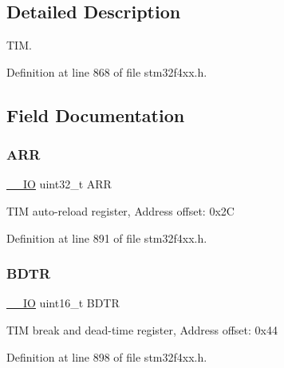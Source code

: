 \subsection{Detailed Description}
T\+IM. 

Definition at line 868 of file stm32f4xx.\+h.



\subsection{Field Documentation}
\mbox{\label{struct_t_i_m___type_def_af17f19bb4aeea3cc14fa73dfa7772cb8}} 
\subsubsection{\texorpdfstring{A\+RR}{ARR}}
{\footnotesize\ttfamily \hyperlink{group___c_m_s_i_s__core__definitions_gaec43007d9998a0a0e01faede4133d6be}{\+\_\+\+\_\+\+IO} uint32\+\_\+t A\+RR}

T\+IM auto-\/reload register, Address offset\+: 0x2C 

Definition at line 891 of file stm32f4xx.\+h.

\mbox{\label{struct_t_i_m___type_def_a112c0403ac38905a70cf5aaa9c8cc38a}} 
\subsubsection{\texorpdfstring{B\+D\+TR}{BDTR}}
{\footnotesize\ttfamily \hyperlink{group___c_m_s_i_s__core__definitions_gaec43007d9998a0a0e01faede4133d6be}{\+\_\+\+\_\+\+IO} uint16\+\_\+t B\+D\+TR}

T\+IM break and dead-\/time register, Address offset\+: 0x44 

Definition at line 898 of file stm32f4xx.\+h.

\mbox{\label{struct_t_i_m___type_def_ab1da3e84848ed66e0577c87c199bfb6d}} 
